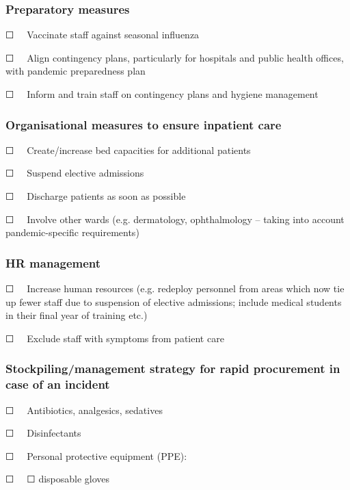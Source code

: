 \documentclass{article}
\begin{document}
\subsubsection{Preparatory measures}\label{H3752751}



☐   Vaccinate staff against seasonal influenza


☐   Align contingency plans, particularly for hospitals and public health offices, with pandemic preparedness plan


☐   Inform and train staff on contingency plans and hygiene management


\subsubsection{Organisational measures to ensure inpatient care}\label{H2170902}



☐   Create/increase bed capacities for additional patients


☐   Suspend elective admissions


☐   Discharge patients as soon as possible


☐   Involve other wards (e.g. dermatology, ophthalmology – taking into account pandemic-specific requirements)


\subsubsection{HR management}\label{H8420461}



☐   Increase human resources (e.g. redeploy personnel from areas which now tie up fewer staff due to suspension of elective admissions; include medical students in their final year of training etc.)


☐   Exclude staff with symptoms from patient care


\subsubsection{Stockpiling/management strategy for rapid procurement in case of an incident}\label{H3837555}



☐   Antibiotics, analgesics, sedatives


☐   Disinfectants


☐   Personal protective equipment (PPE):


☐   ☐ disposable gloves 
\end{document}
